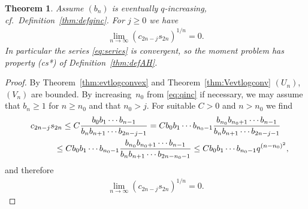 \documentclass[11pt]{article}
\numberwithin{equation}{section}
\newtheorem{thm}{Theorem}[section]
\begin{document}
\begin{thm}\label{thm:AH-logcv2}Assume $(b_n)$ is eventually $q$-increasing, cf.\ Definition~{\rm \ref{thm:defqinc}}. For $j\ge 0$ we have
\begin{gather*}
\lim_{n\to \infty} (c_{2n-j}s_{2n})^{1/n}=0.
\end{gather*}
In particular the series \eqref{eq:series} is convergent, so the moment problem has property {\rm (cs*)} of Definition~{\rm \ref{thm:defAH}}.
\end{thm}

\begin{proof}By Theorem~\ref{thm:evtlogconvex} and Theorem~\ref{thm:Vevtlogconv} $(U_n)$, $(V_n)$ are bounded. By increasing~$n_0$ from \eqref{eq:qinc} if necessary, we may assume that $b_n\ge 1$ for $n\ge n_0$ and that $n_0>j$. For suitable $C>0$ and $n>n_0$ we find
\begin{gather*}
c_{2n-j}s_{2n} \le C{b_0b_1\cdots b_{n-1}\over b_nb_{n+1}\cdots b_{2n-j-1}} =Cb_0b_1\cdots b_{n_0-1}{b_{n_0}b_{n_0+1}\cdots b_{n-1}\over b_nb_{n+1}\cdots b_{2n-j-1}}\\
\hphantom{c_{2n-j}s_{2n}}{} \le C b_0b_1\cdots b_{n_0-1}{b_{n_0}b_{n_0+1}\cdots b_{n-1}\over b_nb_{n+1}\cdots b_{2n-n_0-1} }\le C b_0b_1\cdots b_{n_0-1}q^{(n-n_0)^2},
\end{gather*}
and therefore
\begin{gather*}
\lim_{n\to\infty}(c_{2n-j}s_{2n})^{1/n}=0.\tag*{\qed}
\end{gather*}\renewcommand{\qed}{}
\end{proof}
\end{document}
